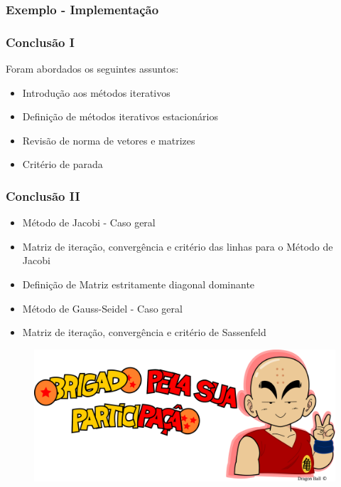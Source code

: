 \documentclass{beamer}
\theoremstyle{mystyle}
\begin{document}
\begin{frame}
	\frametitle{Exemplo - Implementação}
	\centering
	\href{https://colab.research.google.com/drive/1QZ27rGSNhrj7Yc3CHN7KeT3ibrregMkM?usp=sharing}{}
\end{frame}

\begin{frame}
	\frametitle{Conclusão I}	
	Foram abordados os seguintes assuntos:
	\begin{itemize}
		\item Introdução aos métodos iterativos
		\item Definição de métodos iterativos estacionários
		\item Revisão de norma de vetores e matrizes
		\item Critério de parada
	\end{itemize}
\end{frame}

\begin{frame}
	\frametitle{Conclusão II}	
	\begin{itemize}
		\item Método de Jacobi - Caso geral
		\item Matriz de iteração, convergência e critério das linhas para o Método de Jacobi
		\item Definição de Matriz estritamente diagonal dominante
		\item Método de Gauss-Seidel - Caso geral
		\item Matriz de iteração, convergência e critério de Sassenfeld
	\end{itemize}
\end{frame}

\begin{frame}[plain]
\bigskip
\bigskip
\bigskip
\bigskip
\bigskip
\begin{figure}
	\centering
	\includegraphics[width=0.9\linewidth]{../krillin_v}
	\label{fig:luffyv}
\end{figure}
\end{frame}
\end{document}
